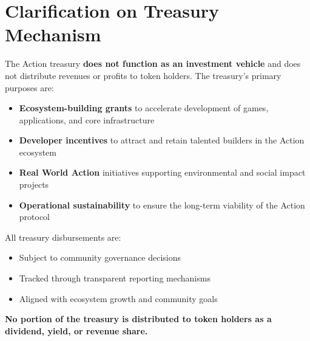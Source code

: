 \section{Clarification on Treasury Mechanism}

The Action treasury \textbf{does not function as an investment vehicle} and does not distribute revenues or profits to token holders. The treasury's primary purposes are:

\begin{itemize}
\item \textbf{Ecosystem-building grants} to accelerate development of games, applications, and core infrastructure
\item \textbf{Developer incentives} to attract and retain talented builders in the Action ecosystem
\item \textbf{Real World Action} initiatives supporting environmental and social impact projects
\item \textbf{Operational sustainability} to ensure the long-term viability of the Action protocol
\end{itemize}

\noindent All treasury disbursements are:
\begin{itemize}
\item Subject to community governance decisions
\item Tracked through transparent reporting mechanisms
\item Aligned with ecosystem growth and community goals
\end{itemize}

\noindent\textbf{No portion of the treasury is distributed to token holders as a dividend, yield, or revenue share.}